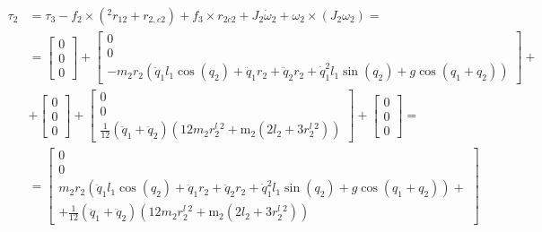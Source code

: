 \documentclass[a4paper,14pt]{extreport}
\begin{document}
\begin{itemize}
\begin{align*}
\tau_2 &= \tau_3 - f_2 \times (^2 r_{12} + r_{2,c2}) + f_3 \times r_{2c2} + J_2 \dot \omega_2 + \omega_2 \times (J_2 \omega_2) =\\
&=
\left[\begin{matrix}0\\0\\0\end{matrix}\right]
+
\left[\begin{matrix}0\\0\\- m_{2} r_{2} \left(\ddot{q}_1 l_{1} \cos{\left (q_{2} \right )} + \ddot{q}_1 r_{2} + \ddot{q}_2 r_{2} + \dot{q}_1^{2} l_{1} \sin{\left (q_{2} \right )} + g \cos{\left (q_{1} + q_{2} \right )}\right)\end{matrix}\right]
+\\
&+
\left[\begin{matrix}0\\0\\0\end{matrix}\right]
+
\left[\begin{matrix}0\\0\\\frac{1}{12} \left(\ddot{q}_1 + \ddot{q}_2\right) \left(12 m_{2} r^{l}_{2}^{2} + \operatorname{m_{2}}{\left (2 l_{2} + 3 r^{l}_{2}^{2} \right )}\right)\end{matrix}\right]
+
\left[\begin{matrix}0\\0\\0\end{matrix}\right]
=\\
&= 
\left[\begin{matrix}0\\0\\m_{2} r_{2} \left(\ddot{q}_1 l_{1} \cos{\left (q_{2} \right )} + \ddot{q}_1 r_{2} + \ddot{q}_2 r_{2} + \dot{q}_1^{2} l_{1} \sin{\left (q_{2} \right )} + g \cos{\left (q_{1} + q_{2} \right )}\right) +\\+ \frac{1}{12} \left(\ddot{q}_1 + \ddot{q}_2\right) \left(12 m_{2} r^{l}_{2}^{2} + \operatorname{m_{2}}{\left (2 l_{2} + 3 r^{l}_{2}^{2} \right )}\right)\end{matrix}\right]
\end{align*}


\end{itemize}
\end{document}

